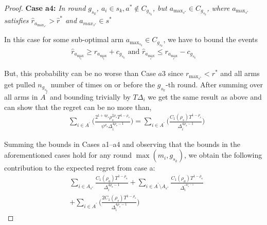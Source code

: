 \begin{proof}
\textbf{Case a4:} \textit{In round $g_{s_{k}}$, $a_{i}\in s_{k}, a^{*}\notin C_{g_{s_{k}}}$, but $a_{\max_{s^{*}}}\in C_{g_{s_{k}}}$, where $a_{\max_{s^{*}}}$ satisfies $\hat{r}_{a_{\max_{s^{*}}}}> \hat{r}^{*}$ and $a_{max_{s^{*}}} \in s^*$ } 

In this case for some sub-optimal arm $a_{\max_{s_{k}}}\in C_{g_{s_{k}}}$, we have to bound the events
	\begin{align*}
  \hat{r}_{a_{\max_{s_{k}}}} \geq r_{a_{\max_{s_{k}}}} +c_{g_{s_{k}}} \text{ and } \hat{r}_{a_{\max_{s^{*}}}} \leq r_{a_{\max_{s^{*}}}} -c_{g_{s_{k}}}
\end{align*}
	 
	 
	 But, this probability can be no worse than Case $a3$ since $r_{\max_{s^{*}}} < r^{*}$ and all arms get pulled $n_{g_{s_{k}}}$ number of times on or before the $g_{s_{k}}$-th round. After summing over all arms in $A^{'}$ and bounding 
trivially by $T\Delta_{i}$ we get the same result as above and can show that the regret can be no more than,
 \begin{align*}
 &\sum_{i\in A^{'}}\bigg(\frac{2^{1+4\rho_{s}}\rho_{s}^{2\rho_{s}}T^{1-\rho_{s}}}{\psi^{\rho_{s}}\Delta_{i}^{4\rho_{s}-1}}\bigg)=\sum_{i\in A^{'}}\bigg(\frac{C_{1}(\rho_{s})T^{1-\rho_{s}}}{\Delta_{i}^{4\rho_{s}-1}}\bigg)
 \end{align*}
 
Summing the bounds in Cases a1--a4 and observing that the bounds in the aforementioned cases hold for any round $\max(m_i,g_{s_k})$, we obtain the following contribution to the expected regret from case a:
\begin{align*}
&\sum_{i\in A_{s^*}} \frac{C_{1}(\rho_{a})T^{1-\rho_{a}}}{\Delta_{i}^{4\rho_{a}-1}} + \sum_{i\in A^{'} \setminus  A_{s^*} } \frac{C_{1}(\rho_{a})T^{1-\rho_{a}}}{\Delta_{i}^{'^{4\rho_{a}-1}}} \\
 & + \sum_{i\in A^{'}}\bigg(\frac{2C_{1}(\rho_{s})T^{1-\rho_{s}}}{\Delta_{i}^{4\rho_{s}-1}}\bigg)
\end{align*}


\end{proof}
